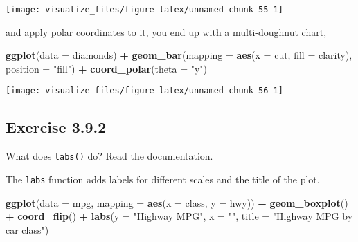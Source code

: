\documentclass[]{book}
\newenvironment{Shaded}{\begin{snugshade}}{\end{snugshade}}
\newcommand{\DataTypeTok}[1]{\textcolor[rgb]{0.13,0.29,0.53}{#1}}
\newcommand{\KeywordTok}[1]{\textcolor[rgb]{0.13,0.29,0.53}{\textbf{#1}}}
\newcommand{\NormalTok}[1]{#1}
\newcommand{\OperatorTok}[1]{\textcolor[rgb]{0.81,0.36,0.00}{\textbf{#1}}}
\newcommand{\StringTok}[1]{\textcolor[rgb]{0.31,0.60,0.02}{#1}}
\theoremstyle{plain}
\theoremstyle{remark}
\theoremstyle{definition}
\theoremstyle{definition}
\theoremstyle{definition}
\theoremstyle{remark}
\begin{document}
\begin{center}\texttt{[image: visualize\_files/figure-latex/unnamed-chunk-55-1]} \end{center}

and apply polar coordinates to it, you end up with a multi-doughnut
chart,

\begin{Shaded}
\begin{Highlighting}[]
\KeywordTok{ggplot}\NormalTok{(}\DataTypeTok{data =}\NormalTok{ diamonds) }\OperatorTok{+}
\StringTok{  }\KeywordTok{geom_bar}\NormalTok{(}\DataTypeTok{mapping =} \KeywordTok{aes}\NormalTok{(}\DataTypeTok{x =}\NormalTok{ cut, }\DataTypeTok{fill =}\NormalTok{ clarity), }\DataTypeTok{position =} \StringTok{"fill"}\NormalTok{) }\OperatorTok{+}
\StringTok{  }\KeywordTok{coord_polar}\NormalTok{(}\DataTypeTok{theta =} \StringTok{"y"}\NormalTok{)}
\end{Highlighting}
\end{Shaded}

\begin{center}\texttt{[image: visualize\_files/figure-latex/unnamed-chunk-56-1]} \end{center}

\hypertarget{exercise-3.9.2}{%
\subsection*{\texorpdfstring{Exercise
{3.9.2}}{Exercise 3.9.2}}\label{exercise-3.9.2}}

What does \texttt{labs()} do? Read the documentation.

The \texttt{labs} function adds labels for different scales and the
title of the plot.

\begin{Shaded}
\begin{Highlighting}[]
\KeywordTok{ggplot}\NormalTok{(}\DataTypeTok{data =}\NormalTok{ mpg, }\DataTypeTok{mapping =} \KeywordTok{aes}\NormalTok{(}\DataTypeTok{x =}\NormalTok{ class, }\DataTypeTok{y =}\NormalTok{ hwy)) }\OperatorTok{+}
\StringTok{  }\KeywordTok{geom_boxplot}\NormalTok{() }\OperatorTok{+}
\StringTok{  }\KeywordTok{coord_flip}\NormalTok{() }\OperatorTok{+}
\StringTok{  }\KeywordTok{labs}\NormalTok{(}\DataTypeTok{y =} \StringTok{"Highway MPG"}\NormalTok{, }\DataTypeTok{x =} \StringTok{""}\NormalTok{, }\DataTypeTok{title =} \StringTok{"Highway MPG by car class"}\NormalTok{)}
\end{Highlighting}
\end{Shaded}
\end{document}

